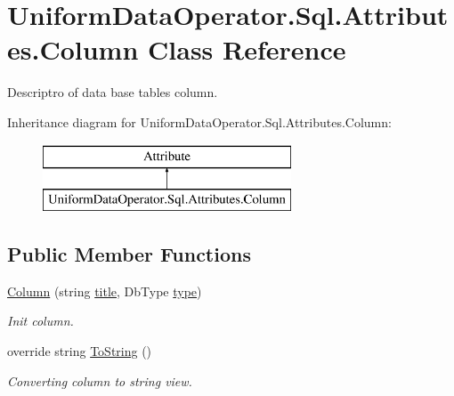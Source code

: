 \hypertarget{class_uniform_data_operator_1_1_sql_1_1_attributes_1_1_column}{}\section{Uniform\+Data\+Operator.\+Sql.\+Attributes.\+Column Class Reference}
\label{class_uniform_data_operator_1_1_sql_1_1_attributes_1_1_column}


Descriptro of data base table\textquotesingle{}s column.  


Inheritance diagram for Uniform\+Data\+Operator.\+Sql.\+Attributes.\+Column\+:\begin{figure}[H]
\begin{center}
\leavevmode
\includegraphics[height=2.000000cm]{d9/d44/class_uniform_data_operator_1_1_sql_1_1_attributes_1_1_column}
\end{center}
\end{figure}
\subsection*{Public Member Functions}
\begin{DoxyCompactItemize}
\item 
\mbox{\hyperlink{class_uniform_data_operator_1_1_sql_1_1_attributes_1_1_column_a8ff9ad5c1502f9e64f08273d7d4a50f6}{Column}} (string \mbox{\hyperlink{class_uniform_data_operator_1_1_sql_1_1_attributes_1_1_column_af17925ba835ca424a854689016526e93}{title}}, Db\+Type \mbox{\hyperlink{class_uniform_data_operator_1_1_sql_1_1_attributes_1_1_column_ad42f01b863fcea9172fc5efe2b8a0834}{type}})
\begin{DoxyCompactList}\small\item\em Init column. \end{DoxyCompactList}\item 
override string \mbox{\hyperlink{class_uniform_data_operator_1_1_sql_1_1_attributes_1_1_column_a20c1639a185fb8f5c3cd09927e79d672}{To\+String}} ()
\begin{DoxyCompactList}\small\item\em Converting column to string view. \end{DoxyCompactList}\end{DoxyCompactItemize}
